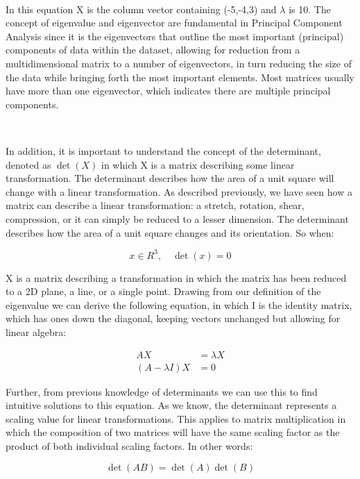 \documentclass{article}
\begin{document}
\

In this equation X is the column vector containing (-5,-4,3) and $\lambda$ is 10. The concept of eigenvalue and eigenvector are fundamental in Principal Component Analysis since it is the eigenvectors that outline the most important (principal) components of data within the dataset, allowing for reduction from a multidimensional matrix to a number of eigenvectors, in turn reducing the size of the data while bringing forth the most important elements. Most matrices usually have more than one eigenvector, which indicates there are multiple principal components.

\

In addition, it is important to understand the concept of the determinant, denoted as $\det(X)$ in which X is a matrix describing some linear transformation. The determinant describes how the area of a unit square will change with a linear transformation. As described previously, we have seen how a matrix can describe a linear transformation: a stretch, rotation, shear, compression, or it can simply be reduced to a lesser dimension. The determinant describes how the area of a unit square changes and its orientation. So when:

\begin{equation*}
x \in R^3, \quad \det(x) = 0
\end{equation*}

X is a matrix describing a transformation in which the matrix has been reduced to a 2D plane, a line, or a single point. Drawing from our definition of the eigenvalue we can derive the following equation, in which I is the identity matrix, which has ones down the diagonal, keeping vectors unchanged but allowing for linear algebra:

\begin{align*}
AX &= \lambda X \\
(A - \lambda I)X &= 0
\end{align*}

Further, from previous knowledge of determinants we can use this to find intuitive solutions to this equation. As we know, the determinant represents a scaling value for linear transformations. This applies to matrix multiplication in which the composition of two matrices will have the same scaling factor as the product of both individual scaling factors. In other words:

\begin{equation*}
\det(AB) = \det(A) \det(B)
\end{equation*}
\end{document}
